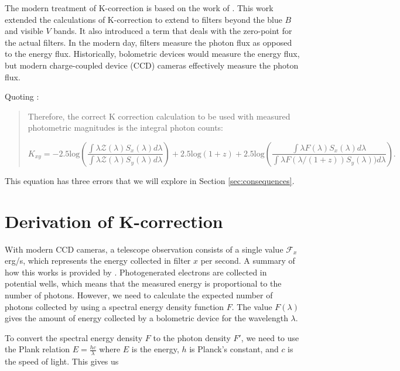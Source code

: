 \documentclass[linenumbers]{aastex631}
\begin{document}
The modern treatment of K-correction is based on the work of \citet{kim1996}.
This work extended the calculations of K-correction to extend to filters beyond
the blue $B$ and visible $V$ bands. It also introduced a term that deals with
the zero-point for the actual filters. In the modern day, filters measure the
photon flux as opposed to the energy flux. Historically, bolometric devices
would measure the energy flux, but modern charge-coupled device (CCD) cameras
effectively measure the photon flux.

Quoting \citet{kim1996}:

\begin{quote}
  Therefore, the correct K correction calculation to be used with measured
  photometric magnitudes is the integral photon counts:

  \begin{equation}
  \label{eq:kim}
    K_{xy} =
      -2.5\text{log} \left(
        \frac{\int \lambda \mathcal{Z}(\lambda)S_x(\lambda)d\lambda}
             {\int \lambda \mathcal{Z}(\lambda)S_y(\lambda)d\lambda}\right)
      + 2.5\text{log}(1+z)
      + 2.5\text{log}\left(
        \frac{\int \lambda F(\lambda)S_x(\lambda)d\lambda}
             {\int \lambda F(\lambda/(1+z))S_y(\lambda))d\lambda}\right).
  \end{equation}
\end{quote}

This equation has three errors that we will explore in Section
\ref{sec:consequences}.

\section{Derivation of K-correction}
\label{sec:derivation}

With modern CCD cameras, a telescope observation consists of a single value
$\mathcal{F}_x$ erg/s, which represents the energy collected in filter $x$ per
second. A summary of how this works is provided by \citet{lesser2015}.
Photogenerated electrons are collected in potential wells, which means that the
measured energy is proportional to the number of photons. However, we need to
calculate the expected number of photons collected by using a spectral energy
density function $F$. The value $F(\lambda)$ gives the amount of energy
collected by a bolometric device for the wavelength $\lambda$.

To convert the spectral energy density $F$ to the photon density $F'$, we need
to use the Plank relation $E = \frac{hc}{\lambda}$ where $E$ is the energy, $h$
is Planck's constant, and $c$ is the speed of light. This gives us
\end{document}

